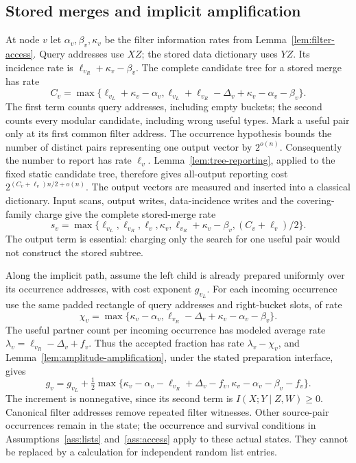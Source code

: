 \documentclass[10pt,a4paper]{article}
\theoremstyle{definition}
\begin{document}
\subsection{Stored merges and implicit amplification}
At node $v$ let $\alpha_v,\beta_v,\kappa_v$ be the filter information
rates from Lemma~\ref{lem:filter-access}.  Query addresses use $XZ$;
the stored data dictionary uses $YZ$.  Its incidence rate is
$\ell_{v_R}+\kappa_v-\beta_v$.  The complete candidate tree for a stored
merge has rate
\begin{equation}
 C_v=\max\{\ell_{v_L}+\kappa_v-\alpha_v,
 \ell_{v_L}+\ell_{v_R}-\Delta_v+
               \kappa_v-\alpha_v-\beta_v\}.
 \label{qracm:candidates}
\end{equation}
The first term counts query addresses, including empty buckets; the
second counts every modular candidate, including wrong useful types.
Mark a useful pair only at its first common filter address.  The
occurrence hypothesis bounds the number of distinct pairs representing
one output vector by $2^{o(n)}$.  Consequently the number to report has
rate $\ell_v$. Lemma~\ref{lem:tree-reporting}, applied to the fixed static candidate tree, therefore gives all-output reporting cost
$2^{(C_v+\ell_v)n/2+o(n)}$.  The output vectors are measured and inserted
into a classical dictionary.  Input scans, output writes, data-incidence
writes and the covering-family charge give the complete stored-merge
rate
\begin{equation}
 s_v=\max\{\ell_{v_L},\ell_{v_R},\ell_v,\kappa_v,
       \ell_{v_R}+\kappa_v-\beta_v,(C_v+\ell_v)/2\}.
 \label{qracm:stored-cost}
\end{equation}
The output term is essential: charging only the search for one useful
pair would not construct the stored subtree.

Along the implicit path, assume the left child is already prepared
uniformly over its occurrence addresses, with cost exponent $g_{v_L}$.
For each incoming occurrence use the same padded rectangle of query
addresses and right-bucket slots, of rate
\[
 \chi_v=\max\{\kappa_v-\alpha_v,
       \ell_{v_R}-\Delta_v+\kappa_v-\alpha_v-\beta_v\}.
\]
The useful partner count per incoming occurrence has modeled average
rate $\lambda_v=\ell_{v_R}-\Delta_v+f_v$.  Thus the accepted fraction
has rate $\lambda_v-\chi_v$, and Lemma~\ref{lem:amplitude-amplification}, under the stated preparation interface, gives
\begin{equation}
 g_v=g_{v_L}+\tfrac12\max\{
   \kappa_v-\alpha_v-\ell_{v_R}+\Delta_v-f_v,
   \kappa_v-\alpha_v-\beta_v-f_v\}.
 \label{qracm:generator}
\end{equation}
The increment is nonnegative, since its second term is
$I(X;Y\mid Z,W)\ge0$.  Canonical filter addresses remove repeated
filter witnesses.  Other source-pair occurrences remain in the state;
the occurrence and survival conditions in Assumptions~\ref{ass:lists}
and~\ref{ass:access} apply to these actual states.  They cannot be
replaced by a calculation for independent random list entries.
\end{document}
